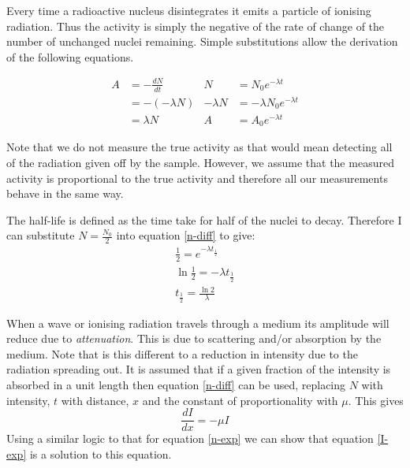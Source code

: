 \documentclass[revision-guide.tex]{subfiles}
\begin{document}
Every time a radioactive nucleus disintegrates it emits a particle of ionising radiation. Thus the activity is simply the negative of the rate of change of the number of unchanged nuclei remaining. Simple substitutions allow the derivation of the following equations.

\begin{align*}
A &= -\frac{dN}{dt} & N &= N_0 e^{-\lambda t} \\
&= -(-\lambda N) & -\lambda N &= -\lambda N_0 e^{-\lambda t} \\
&= \lambda N & A &= A_0e^{-\lambda t}
\end{align*}

Note that we do not measure the true activity as that would mean detecting all of the radiation given off by the sample. However, we assume that the measured activity is proportional to the true activity and therefore all our measurements behave in the same way.


The half-life is defined as the time take for half of the nuclei to decay. Therefore I can substitute $N = \frac{N_0}{2}$ into equation \ref{n-diff} to give:
\begin{align*}
\frac{1}{2} = e^{-\lambda t_\frac{1}{2}}  \\
\ln{\frac{1}{2}} = -\lambda t_\frac{1}{2} \\
t_\frac{1}{2} = \frac{\ln{2}}{\lambda}
\end{align*}



When a wave or ionising radiation travels through a medium its amplitude will reduce due to \emph{attenuation}. This is due to scattering and/or absorption by the medium. Note that is this different to a reduction in intensity due to the radiation spreading out. It is assumed that if a given fraction of the intensity is absorbed in a unit length then equation \ref{n-diff} can be used, replacing $N$ with intensity, $t$ with distance, $x$ and the constant of proportionality with $\mu$. This gives
\begin{equation} \label{I-diff}
\frac{dI}{dx} = -\mu I
\end{equation}
Using a similar logic to that for equation \ref{n-exp} we can show that equation \ref{I-exp} is a solution to this equation.
\end{document}
